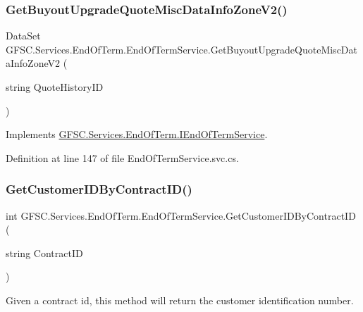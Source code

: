 \subsubsection{\texorpdfstring{Get\+Buyout\+Upgrade\+Quote\+Misc\+Data\+Info\+Zone\+V2()}{GetBuyoutUpgradeQuoteMiscDataInfoZoneV2()}}
{\footnotesize\ttfamily Data\+Set G\+F\+S\+C.\+Services.\+End\+Of\+Term.\+End\+Of\+Term\+Service.\+Get\+Buyout\+Upgrade\+Quote\+Misc\+Data\+Info\+Zone\+V2 (\begin{DoxyParamCaption}\item[{string}]{Quote\+History\+ID }\end{DoxyParamCaption})}



Implements \mbox{\hyperlink{interface_g_f_s_c_1_1_services_1_1_end_of_term_1_1_i_end_of_term_service_a5453f7743fc39bc117dc375bcf06d7da}{G\+F\+S\+C.\+Services.\+End\+Of\+Term.\+I\+End\+Of\+Term\+Service}}.



Definition at line 147 of file End\+Of\+Term\+Service.\+svc.\+cs.

\mbox{\label{class_g_f_s_c_1_1_services_1_1_end_of_term_1_1_end_of_term_service_a3c89756c24382b7a06861e647c349722}} 
\subsubsection{\texorpdfstring{Get\+Customer\+I\+D\+By\+Contract\+I\+D()}{GetCustomerIDByContractID()}}
{\footnotesize\ttfamily int G\+F\+S\+C.\+Services.\+End\+Of\+Term.\+End\+Of\+Term\+Service.\+Get\+Customer\+I\+D\+By\+Contract\+ID (\begin{DoxyParamCaption}\item[{string}]{Contract\+ID }\end{DoxyParamCaption})}



Given a contract id, this method will return the customer identification number. 


